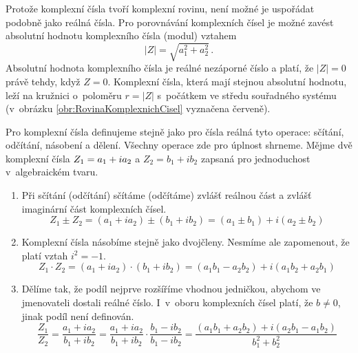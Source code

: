 Protože komplexní čísla tvoří komplexní rovinu, není možné je uspořádat podobně jako reálná čísla. Pro porovnávání komplexních čísel je možné zavést absolutní hodnotu komplexního čísla (modul) vztahem
\begin{equation}
|Z| = \sqrt{a_1^2 + a_2^2} \, \mbox{.}
\label{rov:AbsolutniHodnotaKomplex}
\end{equation}
Absolutní hodnota komplexního čísla je reálné nezáporné číslo a platí, že $|Z| = 0$ právě tehdy, když $Z = 0$. Komplexní čísla, která mají stejnou absolutní hodnotu, leží na kružnici o~poloměru $r = |Z|$ s~počátkem ve středu souřadného systému (v~obrázku \ref{obr:RovinaKomplexnichCisel} vyznačena červeně).

Pro komplexní čísla definujeme stejně jako pro čísla reálná tyto operace: sčítání, odčítání, násobení a dělení. Všechny operace zde pro úplnost shrneme. Mějme dvě komplexní čísla $Z_1 = \nobreak a_1 + ia_2$ a $Z_2=b_1 + ib_2$ zapsaná pro jednoduchost v~algebraickém tvaru.
\begin{enumerate}
\item Při sčítání (odčítání) sčítáme (odčítáme) zvlášť reálnou část a zvlášť imaginární část komplexních čísel.
\begin{equation}
Z_1 \pm Z_2 = (a_1 + ia_2) \pm (b_1 + ib_2) = (a_1 \pm b_1) + i(a_2 \pm b_2)
\label{rov:ScitaniOdcitaniKomplex}
\end{equation}
\item Komplexní čísla násobíme stejně jako dvojčleny. Nesmíme ale zapomenout, že platí vztah $i^2 = -1$.
\begin{equation}
Z_1 \cdot Z_2 = (a_1 + ia_2) \cdot (b_1 + ib_2) = (a_1b_1 - a_2b_2) + i(a_1b_2 + a_2b_1)
\label{rov:NasobeniKomplex}
\end{equation}
\item Dělíme tak, že podíl nejprve rozšíříme vhodnou jedničkou, abychom ve jmenovateli dostali reálné číslo. I~v~oboru komplexních čísel platí, že $b \not = 0$, jinak podíl není definován.
\begin{equation}
\frac{Z_1}{Z_2} = \frac{a_1 + ia_2}{b_1 + ib_2} = \frac{a_1 + ia_2}{b_1 + ib_2} \cdot \frac{b_1 - ib_2}{b_1 - ib_2} = \frac{(a_1b_1 + a_2b_2) + i(a_2b_1 - a_1b_2)}{b_1^2 + b_2^2}
\label{rov:DeleniKomplex}
\end{equation} 
\end{enumerate}

